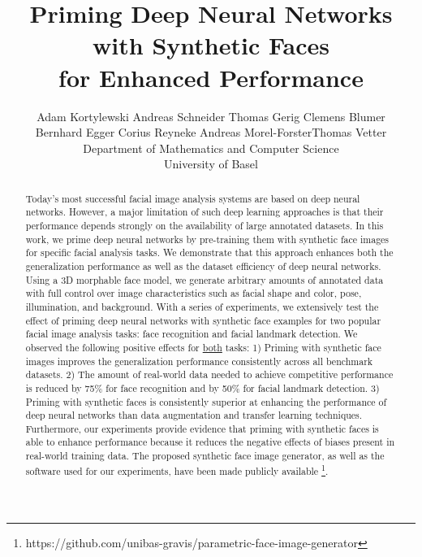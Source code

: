 \documentclass[10pt,twocolumn,letterpaper]{article}
\begin{document}
	\title{Priming Deep Neural Networks with Synthetic Faces \\for Enhanced Performance}
	\author{Adam Kortylewski \;\; Andreas Schneider \;\; Thomas Gerig \;\; Clemens Blumer\\ \;\; Bernhard Egger \;\; Corius Reyneke\;\; Andreas Morel-Forster\;\;Thomas Vetter\vspace{10pt}\\ 
		Department of Mathematics and Computer Science  \;\; \\
		University of Basel}

\maketitle

	\begin{abstract}
	Today's most successful facial image analysis systems are based on deep neural networks. However, a major limitation of such deep learning approaches is that their performance depends strongly on the availability of large annotated datasets. In this work, we prime deep neural networks by pre-training them with synthetic face images for specific facial analysis tasks. We demonstrate that this approach enhances both the generalization performance as well as the dataset efficiency of deep neural networks. Using a 3D morphable face model, we generate arbitrary amounts of annotated data with full control over image characteristics such as facial shape and color, pose, illumination, and background. With a series of experiments, we extensively test the effect of priming deep neural networks with synthetic face examples for two popular facial image analysis tasks: face recognition and facial landmark detection. We observed the following positive effects for \underline{both} tasks: 1) Priming with synthetic face images improves the generalization performance consistently across all benchmark datasets. 2) The amount of real-world data needed to achieve competitive performance is reduced by 75\% for face recognition and by 50\% for facial landmark detection. 3) Priming with synthetic faces is consistently superior at enhancing the performance of deep neural networks than data augmentation and transfer learning techniques. Furthermore, our experiments provide evidence that priming with synthetic faces is able to enhance performance because it reduces the negative effects of biases present in real-world training data. The proposed synthetic face image generator, as well as the software used for our experiments, have been made publicly available \footnote{https://github.com/unibas-gravis/parametric-face-image-generator}.
   
	\end{abstract}
\end{document}
